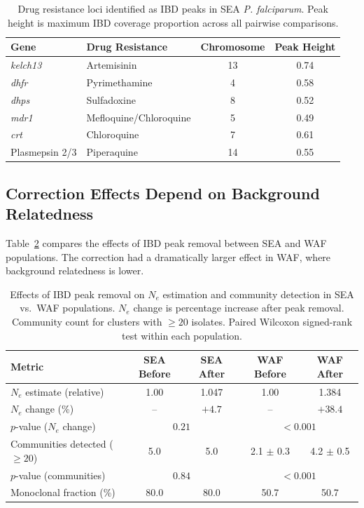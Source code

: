 \documentclass[11pt]{article}
\begin{document}
\begin{table}[H]
\centering
\caption{Drug resistance loci identified as IBD peaks in SEA \textit{P. falciparum}. Peak height is maximum IBD coverage proportion across all pairwise comparisons.}
\label{tab:resistance_loci}
\begin{tabular}{llcc}
\toprule
Gene & Drug Resistance & Chromosome & Peak Height \\
\midrule
\textit{kelch13} & Artemisinin & 13 & 0.74 \\
\textit{dhfr} & Pyrimethamine & 4 & 0.58 \\
\textit{dhps} & Sulfadoxine & 8 & 0.52 \\
\textit{mdr1} & Mefloquine/Chloroquine & 5 & 0.49 \\
\textit{crt} & Chloroquine & 7 & 0.61 \\
Plasmepsin 2/3 & Piperaquine & 14 & 0.55 \\
\bottomrule
\end{tabular}
\end{table}

\subsection{Correction Effects Depend on Background Relatedness}

Table~\ref{tab:correction_comparison} compares the effects of IBD peak removal between SEA and WAF populations. The correction had a dramatically larger effect in WAF, where background relatedness is lower.

\begin{table}[H]
\centering
\caption{Effects of IBD peak removal on $N_e$ estimation and community detection in SEA vs.\ WAF populations. $N_e$ change is percentage increase after peak removal. Community count for clusters with $\geq 20$ isolates. Paired Wilcoxon signed-rank test within each population.}
\label{tab:correction_comparison}
\begin{tabular}{lcccc}
\toprule
Metric & SEA Before & SEA After & WAF Before & WAF After \\
\midrule
$N_e$ estimate (relative) & 1.00 & 1.047 & 1.00 & 1.384 \\
$N_e$ change (\%) & -- & $+4.7$ & -- & $+38.4$ \\
$p$-value ($N_e$ change) & \multicolumn{2}{c}{$0.21$} & \multicolumn{2}{c}{$< 0.001$} \\
Communities detected ($\geq 20$) & 5.0 & 5.0 & 2.1 $\pm$ 0.3 & 4.2 $\pm$ 0.5 \\
$p$-value (communities) & \multicolumn{2}{c}{$0.84$} & \multicolumn{2}{c}{$< 0.001$} \\
Monoclonal fraction (\%) & 80.0 & 80.0 & 50.7 & 50.7 \\
\bottomrule
\end{tabular}
\end{table}
\end{document}
